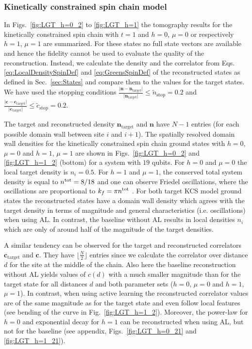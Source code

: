 \documentclass[pra,aps,showpacs,groupedaddress,superscriptaddress,twocolumn,toc=flat,biblatex,footinbib]{revtex4-1}
\renewcommand{\vec}[1]{\bm{#1}}
\begin{document}
\subsubsection{Kinetically constrained spin chain model}

In Figs.~\ref{fig:LGT_h=0_2} to \ref{fig:LGT_h=1} the tomography results for the kinetically constrained spin chain with $t=1$ and $h=0$, $\mu=0$ or respectively $h=1$, $\mu=1$ are summarized. For these states no full state vectors are available and hence the fidelity cannot be used to evaluate the quality of the reconstruction. Instead, we calculate the density and the correlator from Eqs. \eqref{eq:LocalDensitySpinDef} and \eqref{eq:GreensSpinDef} of the reconstructed states as defined in Sec.~\ref{sec:States} and compare them to the values for the target states. We have used the stopping conditions $\frac{\vert \vec{n}-\vec{n}_{\mathrm{target}}\vert}{\vert \vec{n}_{\mathrm{target}}\vert}\leq \tilde{n}_{\mathrm{stop}}=0.2$ and $\frac{\vert \vec{c}-\vec{c}_{\mathrm{target}}\vert}{\vert \vec{c}_{\mathrm{target}}\vert}\leq \tilde{c}_{\mathrm{stop}}=0.2$.


The target and reconstructed density $\vec{n}_{\mathrm{target}}$ and $\vec{n}$ have $N-1$ entries (for each possible domain wall between site $i$ and $i+1$). The spatially resolved domain wall densities for the kinetically constrained spin chain ground states with $h=0$, $\mu=0$ and $h=1$, $\mu=1$ are shown in Figs.~\ref{fig:LGT_h=0_2} and \ref{fig:LGT_h=1_2} (bottom) for a system with $19$ qubits. For $h=0$ and $\mu=0$ the local target density is $n_i=0.5$. For $h=1$ and $\mu=1$, the conserved total system density is equal to $n^{\rm tot} = 8 / 18$ and one can observe Friedel oscillations, where the oscillations are proportional to $k_f = \pi n^{\rm tot}$ \cite{Borla2020}. For both target KCS model ground states the reconstructed states have a domain wall density which agrees with the target density in terms of magnitude and general characteristics (i.e. oscillations) when using AL. In contrast, the baseline without AL results in local densities $n_i$ which are only of around half of the magnitude of the target densities.

A similar tendency can be observed for the target and reconstructed correlators $ \vec{c}_{\mathrm{target}}$ and $\vec{c}$. They have $\lfloor \frac{N}{2}\rfloor$ entries since we calculate the correlator over distance $d$ for the site at the middle of the chain. Also here the baseline reconstruction without AL yields values of $c(d)$ with a much smaller magnitude than for the target state for all distances $d$ and both parameter sets ($h=0$, $\mu=0$ and $h=1$, $\mu=1$). In contrast, when using active learning the reconstructed correlator values are of the same magnitude as for the target state and even follow local features (see bending of the curve in Fig.~\ref{fig:LGT_h=1_2}). Moreover, the power-law for $h=0$ and exponential decay for $h=1$ can be reconstructed when using AL, but not for the baseline (see appendix, Figs.~\ref{fig:LGT_h=0_21} and \ref{fig:LGT_h=1_21}).
\end{document}
